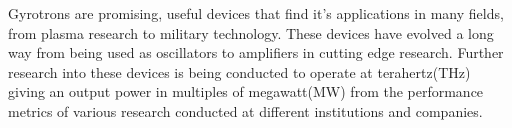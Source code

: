 Gyrotrons are promising, useful devices that find it's applications in many fields, from plasma research to military technology. These devices have evolved a long way from being used as oscillators to amplifiers in cutting edge research. Further research into these devices is being conducted to operate at terahertz(THz) giving an output power in multiples of megawatt(MW) from the performance metrics of various research conducted at different institutions and companies.